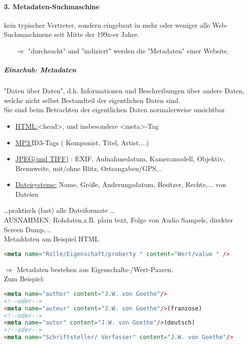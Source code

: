 \paragraph{3. Metadaten-Suchmaschine}\hspace*{1mm}
kein typischer Vertreter, sondern eingebaut in mehr oder weniger alle Web-Suchmaschinene seit Mitte der 199x-er Jahre.
\begin{itemize}
\item[$\Rightarrow$] "durchsucht" und "indiziert" werden die "Metadaten" einer Website.
\end{itemize}
\subparagraph{Einschub: Metadaten}
"Daten über Daten", d.h. Informationen und Beschreibungen über andere Daten, welche nicht selbst Bestandteil der eigentlichen Daten sind. \\
Sie sind beim Betrachten der eigentlichen Daten normalerweise unsichtbar.
\begin{itemize}
\item\underline{HTML:}<head>, und insbesondere <meta>-Tag
\item\underline{MP3:}ID3-Tags ( Komponist, Titel, Artist,...)
\item\underline{JPEG(und TIFF)} : EXIF, Aufnahmedatum, Kameramodell, Objektiv, Brennweite, mit/ohne Blitz, Ortsangaben/GPS...
\item\underline{Dateisysteme:} Name, Größe, Änderungsdatum, Besitzer, Rechte,... von Dateien
\end{itemize}
\dots praktisch (fast) alle Dateiformate \dots \\
AUSNAHMEN: Rohdaten,z.B. plain text, Folge von Audio Sampels, direkter Screen Dump,...\\
Metaddaten am Beispiel HTML
\begin{lstlisting}[caption={Metadaten am Bsp-HTML}, label={lst:metadatenHTML}, language={HTML}]
  <meta name="Rolle/Eigenschaft/proberty " content="Wert/value " />
\end{lstlisting}
$\Rightarrow$ Metadaten bestehen aus Eigenschafts-/Wert-Paaren.\\
 Zum Beispiel:\\
 \begin{lstlisting}[caption={Div. Inhalte von Name}, label={lst:beispieleNAME}, language={HTML}]
<meta name="author" content="J.W. von Goethe"/>
<!--oder-->
<meta name="auteur" content="J.W. von Goethe"/>(franzose)
<!--oder-->
<meta name="autor" content="J.W. von Goethe"/>(deutsch)
<!--oder-->
<meta name="Schriftsteller/ Verfasser" content="J.W. von Goethe"/>
\end{lstlisting}
